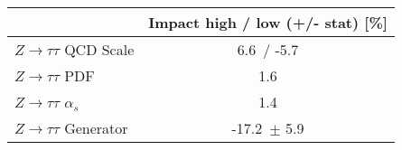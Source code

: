 \begin{tabular}{| l || c | }
\hline
 & Impact high / low (+/- stat) [\%]\tabularnewline
\hline
$Z\rightarrow\tau\tau$ QCD Scale & 6.6\, / -5.7 \tabularnewline
$Z\rightarrow\tau\tau$ PDF & 1.6 \tabularnewline
$Z\rightarrow\tau\tau$ $\alpha_s$ & 1.4 \tabularnewline
$Z\rightarrow\tau\tau$ Generator & -17.2\, $\pm$  5.9  \tabularnewline
\hline
\end{tabular}
